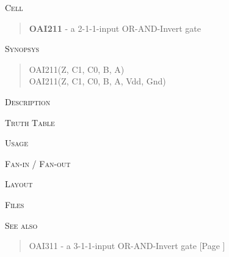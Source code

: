 
\label{OAI211}
\textsc{Cell}
\begin{quote}
    \textbf{OAI211} - a 2-1-1-input OR-AND-Invert gate
\end{quote}

\textsc{Synopsys}
\begin{quote}
    OAI211(Z, C1, C0, B, A) \\
    OAI211(Z, C1, C0, B, A, Vdd, Gnd)
\end{quote}

\textsc{Description}

%

\textsc{Truth Table}


\textsc{Usage}

\textsc{Fan-in / Fan-out}

\textsc{Layout}

\textsc{Files}

\textsc{See also}
\begin{quote}
    OAI311 - a 3-1-1-input OR-AND-Invert gate [Page \pageref{OAI311}] \\
\end{quote}
